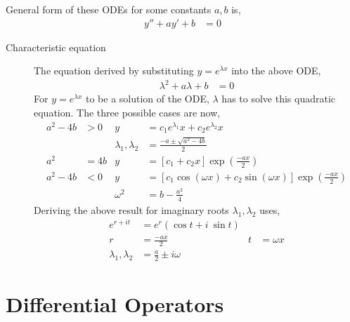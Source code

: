 General form of these ODEs for some constants $ a, b $ is,
\begin{align}
    y'' + ay' + b & = 0
\end{align}

\begin{description}
    \item[Characteristic equation] The equation derived by substituting $ y = e^{\lambda x} $ into
        the above ODE,
        \begin{align}
            \lambda^{2} + a\lambda + b & = 0
        \end{align}
        For $ y = e^{\lambda x}$ to be a solution of the ODE, $\lambda$ has to solve this quadratic
        equation. The three possible cases are now,
        \begin{align}
            a^{2} - 4b & > 0  & y                        & = c_{1}e^{\lambda_{1}}x + c_{2}e^{\lambda_{2}}x                                  \\
                       &      & \lambda_{1}, \lambda_{2} & = \frac{-a \pm \sqrt{a^{2} - 4b}}{2}                                             \\
            a^{2}      & = 4b & y                        & = [ c_{1} + c_{2}x ]\exp \left( \frac{-ax}{2} \right)                            \\
            a^{2} - 4b & < 0  & y                        & = [ c_{1}\cos(\omega x) + c_{2}\sin(\omega x)] \exp \left( \frac{-ax}{2} \right) \\
                       &      & \omega^{2}               & = b - \frac{a^{2}}{4}
        \end{align}
        Deriving the above result for imaginary roots $ \lambda_{1}, \lambda_{2} $ uses,
        \begin{align}
            e^{r + it}               & = e^{r}(\cos t + i\ \sin t)                  \\
            r                        & = \frac{-ax}{2}             & t & = \omega x \\
            \lambda_{1}, \lambda_{2} & = \frac{a}{2} \pm i\omega
        \end{align}
\end{description}

\section{Differential Operators}

